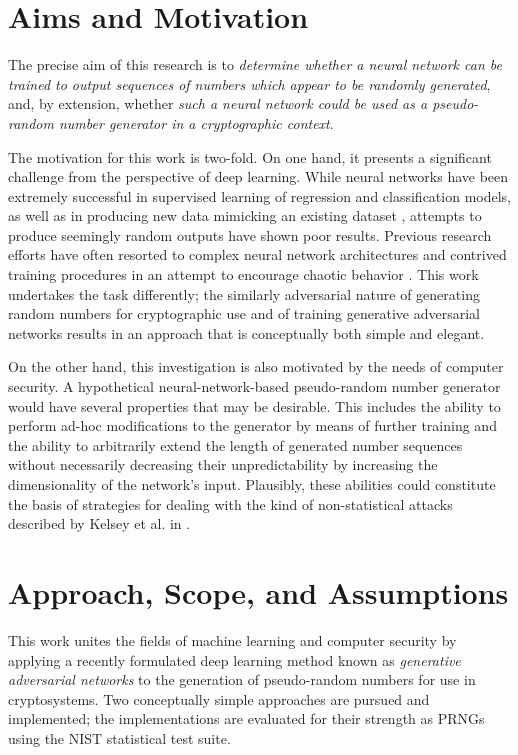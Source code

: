 \documentclass[12pt, titlepage]{report}
\theoremstyle{definition}
\begin{document}
\section{Aims and Motivation}\label{subsection:aims}
The precise aim of this research is to \emph{determine whether a neural network can be trained to output sequences of numbers which appear to be randomly generated}, and, by extension, whether \emph{such a neural network could be used as a pseudo-random number generator in a cryptographic context}. 

The motivation for this work is two-fold. On one hand, it presents a significant challenge from the perspective of deep learning. While neural networks have been extremely successful in supervised learning of regression and classification models, as well as in producing new data mimicking an existing dataset \cite{goodfellow2014generative}, attempts to produce seemingly random outputs have shown poor results. Previous research efforts have often resorted to complex neural network architectures and contrived training procedures in an attempt to encourage chaotic behavior \cite{desai2011pseudo} \cite{desai2012pseudo} \cite{tirdad2010hopfield}. This work undertakes the task differently; the similarly adversarial nature of generating random numbers for cryptographic use and of training generative adversarial networks results in an approach that is conceptually both simple and elegant.

On the other hand, this investigation is also motivated by the needs of computer security. A hypothetical neural-network-based pseudo-random number generator would have several properties that may be desirable. This includes the ability to perform ad-hoc modifications to the generator by means of further training and the ability to arbitrarily extend the length of generated number sequences without necessarily decreasing their unpredictability by increasing the dimensionality of the network's input. Plausibly, these abilities could constitute the basis of strategies for dealing with the kind of non-statistical attacks described by Kelsey et al. in \cite{kelsey1998cryptanalytic}.


\section{Approach, Scope, and Assumptions}
This work unites the fields of machine learning and computer security by applying a recently formulated deep learning method known as \emph{generative adversarial networks} \cite{goodfellow2014generative} to the generation of pseudo-random numbers for use in cryptosystems. Two conceptually simple approaches are pursued and implemented; the implementations are evaluated for their strength as PRNGs using the NIST statistical test suite.
\end{document}
